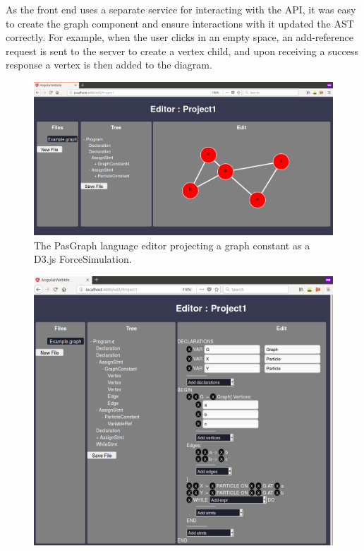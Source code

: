 \documentclass{article}
\begin{document}
{\begin{itemize}
\end{itemize}
As the front end uses a separate service for interacting with the API, it was easy to create the graph component and ensure interactions with it updated the AST correctly. For example, when the user clicks in an empty space, an add-reference request is sent to the server to create a vertex child, and upon receiving a success response a vertex is then added to the diagram.
\begin{figure}[h!]
  \centering
  \includegraphics[width=\linewidth]{./Screenshots/graphUIgraph2narrow.png}
  \caption{The PasGraph language editor projecting a graph constant as a D3.js ForceSimulation.}
  \label{fig:pasgraphUI2}
\end{figure}
\begin{figure}[h!]
  \centering
  \includegraphics[width=\linewidth]{./Screenshots/graphUI3Narrow2.png}

\end{figure}}
\end{document}
